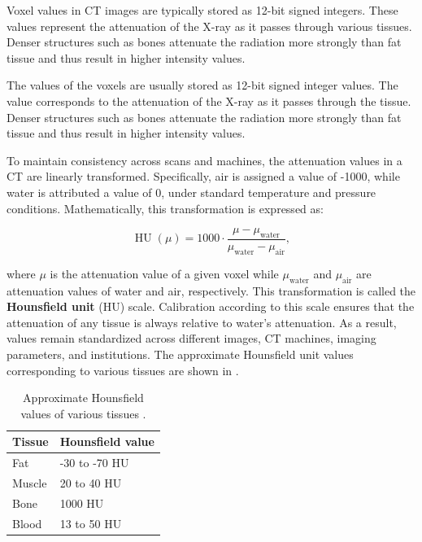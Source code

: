 Voxel values in CT images are typically stored as 12-bit signed integers. These values represent the attenuation of the X-ray as it passes through various tissues. Denser structures such as bones attenuate the radiation more strongly than fat tissue and thus result in higher intensity values.

The values of the voxels are usually stored as 12-bit signed integer values. The value corresponds to the attenuation of the X-ray as it passes through the tissue. Denser structures such as bones attenuate the radiation more strongly than fat tissue and thus result in higher intensity values. 

To maintain consistency across scans and machines, the attenuation values in a CT are linearly transformed. Specifically, air is assigned a value of -1000, while water is attributed a value of 0, under standard temperature and pressure conditions. Mathematically, this transformation is expressed as:


\begin{equation}
	{\operatorname{HU}(\mu)}=1000 \cdot {\frac {\mu -\mu _{\textrm {water}}}{\mu _{\textrm {water}}-\mu _{\textrm {air}}}},
\end{equation}

where $\mu$ is the attenuation value of a given voxel while $\mu_{\textrm {water}}$ and $\mu_{\textrm {air}}$ are attenuation values of water and air, respectively. This transformation is called the \textbf{Hounsfield unit} (HU) scale. Calibration according to this scale ensures that the attenuation of any tissue is always relative to water's attenuation. As a result, values remain standardized across different images, CT machines, imaging parameters, and institutions. The approximate Hounsfield unit values corresponding to various tissues are shown in .

\begin{table}[h!]
\centering
\def\arraystretch{1.2}
\begin{tabularx}{\textwidth}{X X}
 \textbf{Tissue} & \textbf{Hounsfield value} \\
 \hline
 Fat & -30 to -70 HU\\
 Muscle & 20 to 40 HU\\
 Bone & 1000 HU \\
 Blood & 13 to 50 HU\\
\end{tabularx}
\caption{Approximate Hounsfield values of various tissues \cite{fosbinder2011essentials, kamalianComputedTomographyImaging2016}.}
\label{tab:hu-tissues}
\end{table}

